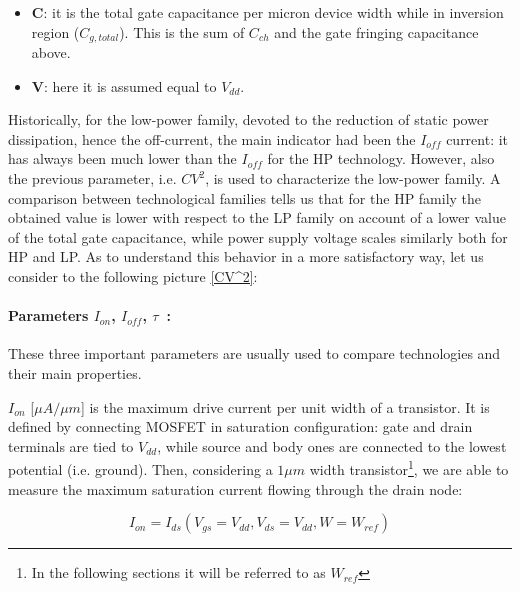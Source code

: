 \documentclass[a4paper, 12pt, twoside, openright]{report}
\begin{document}
\begin{itemize}
\item \textbf{C}: it is the total gate capacitance per micron device width while in inversion region ($C_{g,total}$). This is the sum of $C_{ch}$ and the gate fringing capacitance above.
\item \textbf{V}: here it is assumed equal to $V_{dd}$.
\end{itemize}

Historically, for the low-power family, devoted to the reduction of static power dissipation, hence the off-current, the main indicator had been the $I_{off}$ current: it has always been much lower than the $I_{off}$ for the HP technology. However, also the previous parameter, i.e. $CV^{2}$, is used to characterize the low-power family. A comparison between technological families tells us that for the HP family the obtained value is lower with respect to the LP family on account of a lower value of the total gate capacitance, while power supply voltage scales similarly both for HP and LP. As to understand this behavior in a more satisfactory way, let us consider to the following picture \ref{CV^2}:



\paragraph{Parameters $I_{on}$, $I_{off}$, $\tau$~:} These three important parameters are usually used to compare technologies and their main properties.

$I_{on}$ [$\mu A/\mu m$] is the maximum drive current per unit width of a transistor. It is defined by connecting MOSFET in saturation configuration: gate and drain terminals are tied to $V_{dd}$, while source and body ones are connected to the lowest potential (i.e. ground). Then, considering a $1 \mu m$ width transistor\footnote{In the following sections it will be referred to as $W_{ref}$}, we are able to measure the maximum saturation current flowing through the drain node:

\begin{equation}
I_{on} = I_{ds}(V_{gs}=V_{dd}, V_{ds}=V_{dd}, W=W_{ref})
\label{}
\end{equation} 
\end{document}
